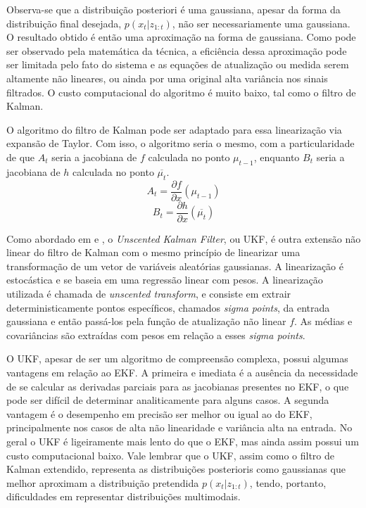 \documentclass[paper=a4, fontsize=11pt]{scrartcl}
\begin{document}
Observa-se que a distribuição posteriori é uma gaussiana, apesar da forma da distribuição final desejada, $p(x_t |z_{1:t})$, não ser necessariamente uma gaussiana. O resultado obtido é então uma aproximação na forma de gaussiana. Como pode ser observado pela matemática da técnica, a eficiência dessa aproximação pode ser limitada pelo fato do sistema e as equações de atualização ou medida serem altamente não lineares, ou ainda por uma original alta variância nos sinais filtrados. O custo computacional do algoritmo é muito baixo, tal como o filtro de Kalman.

O algoritmo do filtro de Kalman pode ser adaptado para essa linearização via expansão de Taylor. Com isso, o algoritmo seria o mesmo, com a particularidade de que $A_t$ seria a jacobiana de $f$ calculada no ponto $\mu_{t-1}$, enquanto $B_t$ seria a jacobiana de $h$ calculada no ponto $\overline{\mu_t}$.
\begin{equation}
    A_t = \frac{\partial f}{\partial x}(\mu_{t-1})
\end{equation}
\begin{equation}
    B_t = \frac{\partial h}{\partial x}(\overline{\mu_t})
\end{equation}

Como abordado em \cite{unscented_filtering} e \cite{ukf}, o \textit{Unscented Kalman Filter}, ou UKF, é outra extensão não linear do filtro de Kalman com o mesmo princípio de linearizar uma transformação de um vetor de variáveis aleatórias gaussianas. A linearização é estocástica e se baseia em uma regressão linear com pesos.
A linearização utilizada é chamada de \textit{unscented transform}, e consiste em extrair deterministicamente pontos específicos, chamados \textit{sigma points}, da entrada gaussiana e então passá-los pela função de atualização não linear $f$. As médias e covariâncias são extraídas com pesos em relação a esses \textit{sigma points}.

O UKF, apesar de ser um algoritmo de compreensão complexa, possui algumas vantagens em relação ao EKF. A primeira e imediata é a ausência da necessidade de se calcular as derivadas parciais para as jacobianas presentes no EKF, o que pode ser difícil de determinar analiticamente para alguns casos. A segunda vantagem é o desempenho em precisão ser melhor ou igual ao do EKF, principalmente nos casos de alta não linearidade e variância alta na entrada. No geral o UKF é ligeiramente mais lento do que o EKF, mas ainda assim possui um custo computacional baixo. Vale lembrar que o UKF, assim como o filtro de Kalman extendido, representa as distribuições posterioris como gaussianas que melhor aproximam a distribuição pretendida $p(x_t |z_{1:t})$, tendo, portanto, dificuldades em representar distribuições multimodais. 
\end{document}
